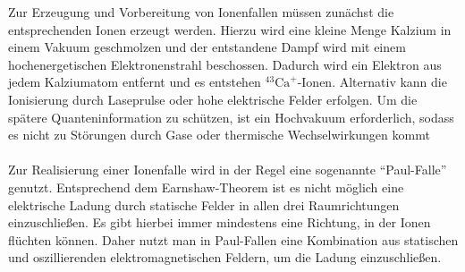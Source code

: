Zur Erzeugung und Vorbereitung von Ionenfallen müssen zunächst die entsprechenden Ionen erzeugt werden. Hierzu wird eine kleine Menge Kalzium in einem Vakuum geschmolzen und der entstandene Dampf wird mit einem hochenergetischen Elektronenstrahl beschossen. Dadurch wird ein Elektron aus jedem Kalziumatom entfernt und es entstehen ${}^{43}\mathrm{Ca}^+$-Ionen. 
\cite{kasirajan_fundamentals_2021} %
Alternativ kann die Ionisierung durch Laseprulse oder hohe elektrische Felder erfolgen. \cite{lapierre_getting_2022} %
Um die spätere Quanteninformation zu schützen, ist ein Hochvakuum erforderlich, sodass es nicht zu Störungen durch Gase oder thermische Wechselwirkungen kommt \cite{kasirajan_fundamentals_2021}
\\
\\
Zur Realisierung einer Ionenfalle wird in der Regel eine sogenannte ``Paul-Falle'' genutzt. Entsprechend dem Earnshaw-Theorem ist es nicht möglich eine elektrische Ladung durch statische Felder in allen drei Raumrichtungen einzuschließen. Es gibt hierbei immer mindestens eine Richtung, in der Ionen flüchten können. Daher nutzt man in Paul-Fallen eine Kombination aus statischen und oszillierenden elektromagnetischen Feldern, um die Ladung einzuschließen. \cite{lapierre_getting_2022} %

